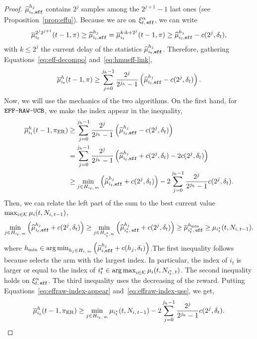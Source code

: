 \begin{proof}
$\widehat{\mu}_{i_t,\texttt{eff}}^{h_j}$ contains $2^j$ samples among the $2^{j+1}-1$ last ones (see Proposition~\ref{prop:effu}). Because we are on $\xi^\alpha_{t,\, \texttt{eff}}$,  we can write
\begin{equation}
\label{eq:hmueff-link}
\overline{\mu}^{2^{j}2^{j+1}}_{i_t}(t-1,\pi) \geq \widehat{\mu}_{i_t,\texttt{eff}}^{h_j} = \overline{\mu}^{k : k+2^{j}}_{i_t}(t-1,\pi)\geq  \widehat{\mu}_{i_t,\texttt{eff}}^{h_j} - c(2^j, \delta_t),
\end{equation}
with $k\leq 2^j$ the current delay of the statistics $\widehat{\mu}_{i_t,\texttt{eff}}^{h_j}$. Therefore, gathering Equations~\ref{eq:eff-decompo} and~\ref{eq:hmueff-link}, 
\begin{equation}
\label{eq:eff-general}
\overline{\mu}^{h}_{i_t}(t-1,\pi) \geq \sum_{j=0}^{j_h-1} \frac{2^j}{2^{j_h}-1} \left(\widehat{\mu}_{i_t,\texttt{eff}}^{h_j} - c(2^j, \delta_t)\right).
\end{equation}
Now, we will use the mechanics of the two algorithms. On the first hand, for $\normalfont \texttt{EFF-RAW-UCB}$, we make the index appear in the inequality,
\begin{align}
 \overline{\mu}^{h}_{i_t}(t-1,\normalfont \pi_{\rm ER}) &\geq \sum_{j=0}^{j_h-1} \frac{2^j}{2^{j_h}-1} \left(\widehat{\mu}_{i_t,\texttt{eff}}^{h_j} - c(2^j, \delta_t)\right) \nonumber\\
 &=\sum_{j=0}^{j_h-1} \frac{2^j}{2^{j_h}-1} \left(\widehat{\mu}_{i_t,\texttt{eff}}^{h_j} + c(2^j, \delta_t) - 2c(2^j, \delta_t)\right)\nonumber\\
 &\geq \min_{j \in H_{i_t,\,m}} \left(\widehat{\mu}_{i_t,\texttt{eff}}^{h_j} + c(2^j, \delta_t)\right) - 2 \sum_{j=0}^{j_h-1} \frac{2^{j}}{2^{j_h}-1} c(2^j, \delta_t).
 \label{eq:effraw-index-appear}
 \end{align}
 Then, we can relate the left part of the sum to the best current value $\max_{i\in \mathcal{K}} \mu_i(t, N_{i,\,t-1})$,
 \begin{equation}
\min_{j \in H_{i_t,\,m}} \left(\widehat{\mu}_{i_t,\texttt{eff}}^{h_j} + c(2^j, \delta_t)\right) \geq \min_{j \in H_{i^\star_t,m}} \left(\widehat{\mu}_{i^\star_t,\, \texttt{eff}}^{h_j} + c(2^j, \delta_t)\right)\geq  \overline{\mu}_{i^\star_t,\, \texttt{eff}}^{h_{\min}} \geq \mu_{i^\star_t}(t,N_{i,\,t-1}).
 \label{eq:effraw-index-use}
 \end{equation}
%
where $h_{\min} \in \operatorname*{arg\,min}_{h_j \in H_{i,\,m}} \left(\widehat{\mu}_{i,\texttt{eff}}^{h_j} + c(h_j, \delta_t)\right) $.The first inequality follows because \EFFRAW selects the arm with the largest index. In particular, the index of $i_t$ is larger or equal to the index of $i^\star_t \in \operatorname*{arg\,max}_{i\in \mathcal{K}} \mu_i(t, N_{i^\star_t,\,t})$. The second inequality holds on $\xi^\alpha_{t,\, \texttt{eff}}$. The third inequality uses the decreasing of the reward. Putting Equations~\ref{eq:effraw-index-appear} and~\ref{eq:effraw-index-use}, we get,
\begin{equation}
\label{eq:effraw-result}
\bmu^{h}_{i_t}(t-1,\piER) \geq \min_{j \in \Hitm} \mu_{\ist}(t,\Nitmone)- 2 \sum_{j=0}^{j_h-1} \frac{2^{j}}{2^{j_h}-1} c(2^j, \delta_t).

\end{equation}
\end{proof}

